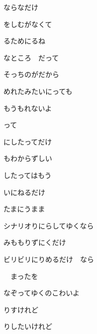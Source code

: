 \documentclass[a4paper,tate,twocolumn,12pt]{ltjtarticle}
\begin{document}
\begin{flushleft}
\noindent\begin{minipage}{\linewidth}
ならなだけ
\end{minipage}

\vspace{2em}

\noindent\begin{minipage}{\linewidth}
をしむがなくて

るためにるね

なところ　だって

そっちのがだから

めれたみたいにっても

もうもれないよ

って
\end{minipage}

\vspace{2em}

\noindent\begin{minipage}{\linewidth}
にしたってだけ

もわからずしい

したってはもう

いにねるだけ

たまにうまま

シナリオりにらしてゆくなら

みももりずにくだけ

ビリビリにりめるだけ　なら
\end{minipage}

\vspace{2em}

\noindent\begin{minipage}{\linewidth}
　まったを

なぞってゆくのこわいよ

りすけれど

りしたいけれど


\end{minipage}
\end{flushleft}
\end{document}
